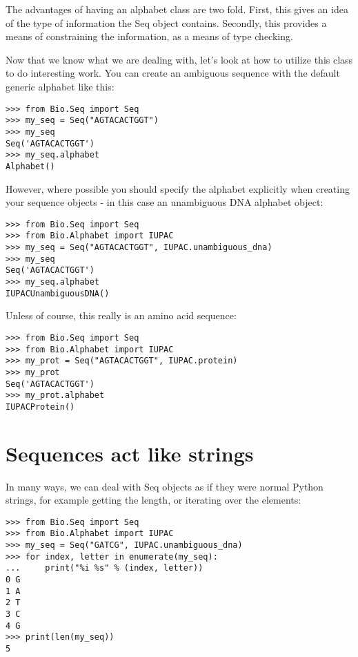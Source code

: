 The advantages of having an alphabet class are two fold. First, this gives an idea of the type of information the Seq object contains. Secondly, this provides a means of constraining the information, as a means of type checking.

Now that we know what we are dealing with, let's look at how to utilize this class to do interesting work.
You can create an ambiguous sequence with the default generic alphabet like this:

\begin{verbatim}
>>> from Bio.Seq import Seq
>>> my_seq = Seq("AGTACACTGGT")
>>> my_seq
Seq('AGTACACTGGT')
>>> my_seq.alphabet
Alphabet()
\end{verbatim}

However, where possible you should specify the alphabet explicitly when creating your sequence objects - in this case an unambiguous DNA alphabet object:

\begin{verbatim}
>>> from Bio.Seq import Seq
>>> from Bio.Alphabet import IUPAC
>>> my_seq = Seq("AGTACACTGGT", IUPAC.unambiguous_dna)
>>> my_seq
Seq('AGTACACTGGT')
>>> my_seq.alphabet
IUPACUnambiguousDNA()
\end{verbatim}

Unless of course, this really is an amino acid sequence:

\begin{verbatim}
>>> from Bio.Seq import Seq
>>> from Bio.Alphabet import IUPAC
>>> my_prot = Seq("AGTACACTGGT", IUPAC.protein)
>>> my_prot
Seq('AGTACACTGGT')
>>> my_prot.alphabet
IUPACProtein()
\end{verbatim}

\section{Sequences act like strings}

In many ways, we can deal with Seq objects as if they were normal Python strings, for example getting the length, or iterating over the elements:

\begin{verbatim}
>>> from Bio.Seq import Seq
>>> from Bio.Alphabet import IUPAC
>>> my_seq = Seq("GATCG", IUPAC.unambiguous_dna)
>>> for index, letter in enumerate(my_seq):
...     print("%i %s" % (index, letter))
0 G
1 A
2 T
3 C
4 G
>>> print(len(my_seq))
5
\end{verbatim}

